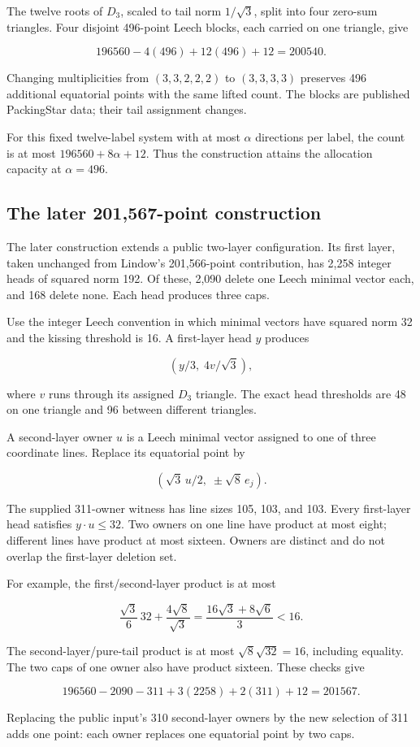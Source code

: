 The twelve roots of \(D_3\), scaled to tail norm \(1/\sqrt3\), split
into four zero-sum triangles. Four disjoint 496-point Leech blocks, each
carried on one triangle, give

\[
196560-4(496)+12(496)+12=200540.
\]

Changing multiplicities from \((3,3,2,2,2)\) to \((3,3,3,3)\)
preserves 496 additional equatorial points with the same lifted count.
The blocks are published PackingStar data; their tail assignment changes.

For this fixed twelve-label system with at most \(\alpha\) directions
per label, the count is at most \(196560+8\alpha+12\). Thus the
construction attains the allocation capacity at \(\alpha=496\).

\subsection{The later 201,567-point
construction}

The later construction extends a public two-layer configuration. Its
first layer, taken unchanged from Lindow's 201,566-point contribution,
has 2,258 integer heads of squared norm 192. Of these, 2,090 delete one
Leech minimal vector each, and 168 delete none. Each head produces three
caps.

Use the integer Leech convention in which minimal vectors have squared
norm 32 and the kissing threshold is 16. A first-layer head \(y\)
produces

\[
(y/3,\;4v/\sqrt3),
\]

where \(v\) runs through its assigned \(D_3\) triangle. The exact head
thresholds are 48 on one triangle and 96 between different triangles.

A second-layer owner \(u\) is a Leech minimal vector assigned to one of
three coordinate lines. Replace its equatorial point by

\[
(\sqrt3\,u/2,\;\pm\sqrt8\,e_j).
\]

The supplied 311-owner witness has line sizes 105, 103, and 103. Every
first-layer head satisfies \(y\cdot u\le32\). Two owners on one line
have product at most eight; different lines have product at most
sixteen. Owners are distinct and do not overlap the first-layer deletion
set.

For example, the first/second-layer product is at most

\[
\frac{\sqrt3}{6}\,32+\frac{4\sqrt8}{\sqrt3}
=\frac{16\sqrt3+8\sqrt6}{3}<16.
\]

The second-layer/pure-tail product is at most \(\sqrt8\sqrt{32}=16\),
including equality. The two caps of one owner also have product sixteen.
These checks give

\[
196560-2090-311+3(2258)+2(311)+12=201567.
\]

Replacing the public input's 310 second-layer owners by the new
selection of 311 adds one point: each owner replaces one equatorial
point by two caps.
